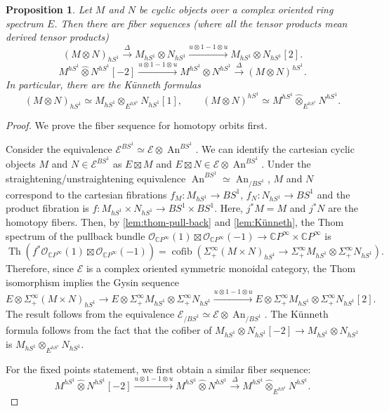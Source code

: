 \documentclass[11pt]{amsart}
\numberwithin{equation}{section}
\theoremstyle{plain}
\newtheorem{Prop}[prop]{Proposition}
\theoremstyle{definition}
\theoremstyle{remark}
\newcommand{\bC} { {\mathbb{C}}}
\newcommand{\cE} { {\mathcal{E}}}
\newcommand{\cO} { {\mathcal{O}}}
\newcommand{\Thom}{\operatorname{Th}}
\newcommand\An{ {\operatorname{An} } }
\begin{document}
\begin{Prop}\label{prop:Künneth-cyclic}
    Let $M$ and $N$ be cyclic objects over a complex oriented ring spectrum $E$. Then there are fiber sequences (where all the tensor products mean derived tensor products)
    \[(M \otimes N)_{hS^1} \xrightarrow{\Delta} M_{hS^1} \otimes N_{hS^1} \xrightarrow{u \otimes 1 - 1 \otimes u} M_{hS^1} \otimes N_{hS^1}[2].\]
  \[  M^{hS^1} \widehat\otimes N^{hS^1}[-2] \xrightarrow{u \otimes 1 - 1 \otimes u} M^{hS^1} \widehat\otimes N^{hS^1}  \xrightarrow{\Delta}  (M \otimes N)^{hS^1}.\]
    In particular, there are the K\"unneth formulas 
    \[(M \otimes N)_{hS^1} \simeq M_{hS^1} \otimes_{E^{hS^1}} N_{hS^1}[1],\qquad (M \otimes N)^{hS^1} \simeq M^{hS^1} \widehat{\otimes}_{E^{hS^1}} N^{hS^1}.\]
\end{Prop}
\begin{proof}We prove the fiber sequence for homotopy orbits first.

Consider the equivalence $\cE^{BS^1} \simeq \cE \otimes \An^{BS^1}$. We can identify the cartesian cyclic objects $M$ and $N \in \cE^{BS^1}$ as $E \boxtimes M$ and $E \boxtimes N \in \cE \otimes \An^{BS^1}$. Under the straightening/unstraightening equivalence $\An^{BS^1} \simeq \An_{/BS^1}$, $M$ and $N$ correspond to the cartesian fibrations $f_M: M_{hS^1} \to BS^1$, $f_N: N_{hS^1} \to BS^1$ and the product fibration is $f: M_{hS^1} \times N_{hS^1} \to BS^1 \times BS^1$. Here,
    $j^*M = M$ and $j^*N$ are the homotopy fibers.
    Then, by \autoref{lem:thom-pull-back} and \autoref{lem:Künneth}, the Thom spectrum of the pullback bundle $\cO_{\bC P^\infty}(1) \boxtimes \cO_{\bC P^\infty}(-1) \to \bC P^\infty \times \bC P^\infty$ is
    \[\Thom(f^*\cO_{\bC P^\infty}(1) \boxtimes \cO_{\bC P^\infty}(-1)) = \operatorname{cofib}(\Sigma^\infty_+(M \times N)_{hS^1} \to \Sigma^\infty_+M_{hS^1} \otimes \Sigma^\infty_+N_{hS^1}).\]
    Therefore, since $\cE$ is a complex oriented symmetric monoidal category, the Thom isomorphism implies the Gysin sequence
    \[E \otimes \Sigma^\infty_+(M \times N)_{hS^1} \to E \otimes \Sigma^\infty_+M_{hS^1} \otimes \Sigma^\infty_+N_{hS^1} \xrightarrow{u \otimes 1 - 1 \otimes u} E \otimes \Sigma^\infty_+M_{hS^1} \otimes \Sigma^\infty_+N_{hS^1}[2].\]
    The result follows from the equivalence $\cE_{/BS^1} \simeq \cE \otimes \An_{/BS^1}$. The K\"unneth formula follows from the fact that the cofiber of $M_{hS^1} \otimes N_{hS^1} [-2]\rightarrow M_{hS^1} \otimes N_{hS^1}$ is $M_{hS^1} \otimes_{E^{hS^1}} N_{hS^1}$.

    For the fixed points statement, we first obtain a similar fiber sequence:
    \[  M^{hS^1}  \widehat\otimes N^{hS^1}[-2] \xrightarrow{u \otimes 1 - 1 \otimes u} M^{hS^1}  \widehat\otimes N^{hS^1}  \xrightarrow{\Delta}  M^{hS^1} \widehat\otimes_{E^{hS^1}} N^{hS^1}.\]


\end{proof}
\end{document}
